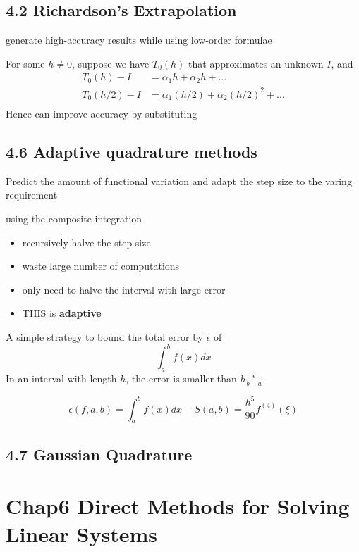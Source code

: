 \documentclass[11pt]{article}
\begin{document}
\subsection{4.2 Richardson's Extrapolation}
\label{sec:org4d47759}
generate high-accuracy results while using low-order formulae

For some \(h\neq 0\), suppose we have \(T_0(h)\) that approximates an unknown
\(I\), and
\begin{align*}
T_0(h)-I&=\alpha_1 h+\alpha_2h+\dots\\
T_0(h/2)-I&=\alpha_1(h/2)+\alpha_2(h/2)^2+\dots\\
\end{align*}
Hence can improve accuracy by substituting

\subsection{4.6 Adaptive quadrature methods}
\label{sec:org6460a68}
Predict the amount of functional variation and adapt the step size to the
varing requirement

using the composite integration
\begin{itemize}
\item recursively halve the step size
\item waste large number of computations
\item only need to halve the interval with large error
\item THIS is \textbf{adaptive}
\end{itemize}


A simple strategy to bound the total error by \(\epsilon\) of
\begin{equation*}
\int_a^bf(x)dx
\end{equation*}
In an interval with length \(h\), the error is smaller than
\(h\frac{\epsilon}{b-a}\)


\begin{equation*}
\epsilon(f,a,b)=\int_a^bf(x)dx-S(a,b)=\frac{h^5}{90}f^{(4)}(\xi)
\end{equation*}

\subsection{4.7 Gaussian Quadrature}
\label{sec:orgd033245}
\section{Chap6 Direct Methods for Solving Linear Systems}
\label{sec:org2235e89}
\end{document}
